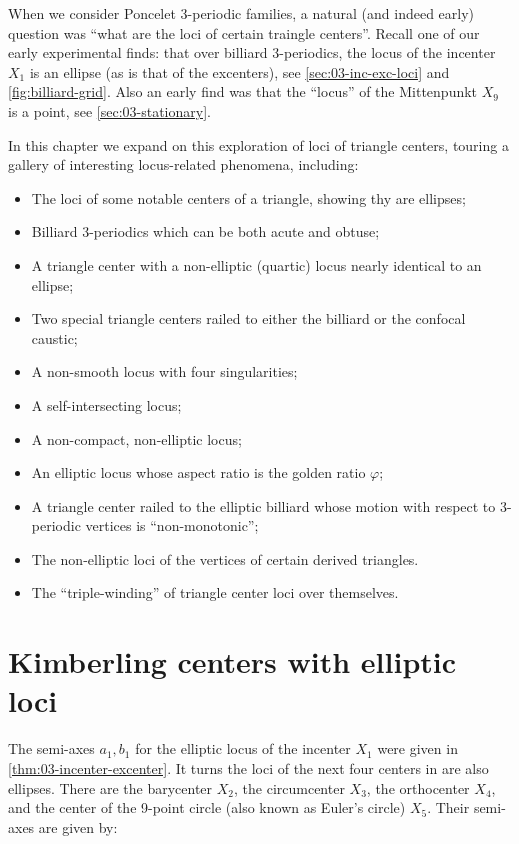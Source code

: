 When we consider Poncelet 3-periodic families, a natural (and indeed early) question was ``what are the loci of certain traingle centers''. Recall one of our early experimental finds: that over billiard 3-periodics, the locus of the incenter $X_1$ is an ellipse (as is that of the excenters), see \cref{sec:03-inc-exc-loci} and \cref{fig:billiard-grid}. Also an early find was that the ``locus'' of the Mittenpunkt $X_9$ is a point, see \cref{sec:03-stationary}.

In this chapter we expand on this exploration of loci of triangle centers, touring a gallery of interesting locus-related phenomena, including:

\begin{itemize}
    \item The loci of some notable centers of a triangle, showing thy are ellipses;
    \item Billiard 3-periodics which can be both acute and obtuse;
    \item A triangle center with a non-elliptic (quartic) locus nearly identical to an ellipse;
    \item Two special triangle centers railed to either the billiard or the confocal caustic;
    \item A non-smooth locus with four singularities;
    \item A self-intersecting locus;
    \item A non-compact, non-elliptic locus;
    \item An elliptic locus whose aspect ratio is the golden ratio $\varphi$;
    \item A triangle center railed to the elliptic billiard whose motion with respect to 3-periodic vertices is ``non-monotonic'';
    \item The non-elliptic loci of the vertices of certain derived triangles. 
    \item The ``triple-winding'' of triangle center loci over themselves.
\end{itemize}

\section{Kimberling centers with elliptic loci}

The semi-axes $a_1,b_1$ for the elliptic locus of the incenter $X_1$ were given in \cref{thm:03-incenter-excenter}. It turns the loci of the next four centers in \cite{etc} are also ellipses. There are the barycenter $X_2$, the circumcenter $X_3$, the orthocenter $X_4$, and the center of the 9-point circle (also known as Euler's circle) $X_5$. Their semi-axes are given by:


